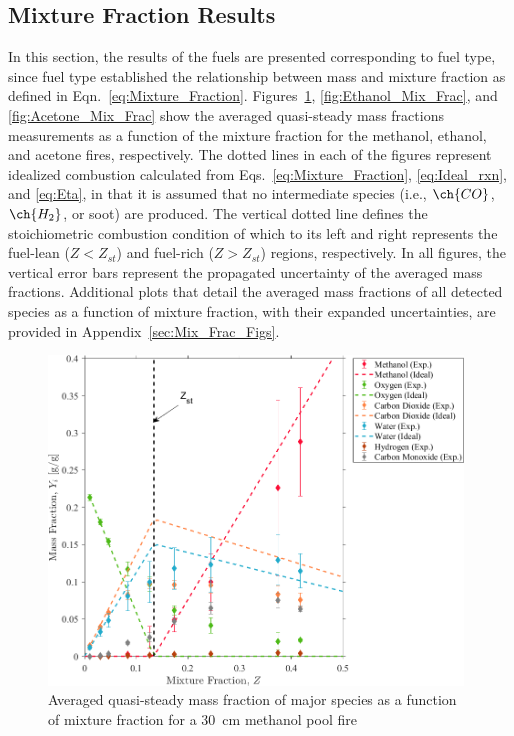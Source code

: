 \documentclass[12pt]{article}
\begin{document}
\subsection{Mixture Fraction Results}
\label{ssec:Mixture_Fraction_Results}
In this section, the results of the fuels are presented corresponding to fuel type, since fuel type established the relationship between mass and mixture fraction as defined in Eqn.~\ref{eq:Mixture_Fraction}. Figures~\ref{fig:Methanol_Mix_Frac}, \ref{fig:Ethanol_Mix_Frac}, and \ref{fig:Acetone_Mix_Frac} show the averaged quasi-steady mass fractions measurements as a function of the mixture fraction for the methanol, ethanol, and acetone fires, respectively. The dotted lines in each of the figures represent idealized combustion calculated from Eqs.~\ref{eq:Mixture_Fraction}, \ref{eq:Ideal_rxn}, and \ref{eq:Eta}, in that it is assumed that no intermediate species (i.e., $\ch{CO}$, $\ch{H_{2}}$, or soot) are produced. The vertical dotted line defines the stoichiometric combustion condition of which to its left and right represents the fuel-lean ($Z<Z_{st}$) and fuel-rich ($Z>Z_{st}$) regions, respectively. In all figures, the vertical error bars represent the propagated uncertainty of the averaged mass fractions. Additional plots that detail the averaged mass fractions of all detected species as a function of mixture fraction, with their expanded uncertainties, are provided in Appendix~\ref{sec:Mix_Frac_Figs}. 

\begin{figure}[!]
	\centering
\includegraphics[width=11.0cm,keepaspectratio]{Methanol_OVERALL_Mass_Frac_Mix_Frac.png}
	\caption[Averaged quasi-steady mass fraction of major species as a function of mixture fraction for a \SI{30}{cm} methanol pool fire]{Averaged quasi-steady mass fraction of major species as a function of mixture fraction for a \SI{30}{cm} methanol pool fire}
	\label{fig:Methanol_Mix_Frac}
\end{figure}
\end{document}
